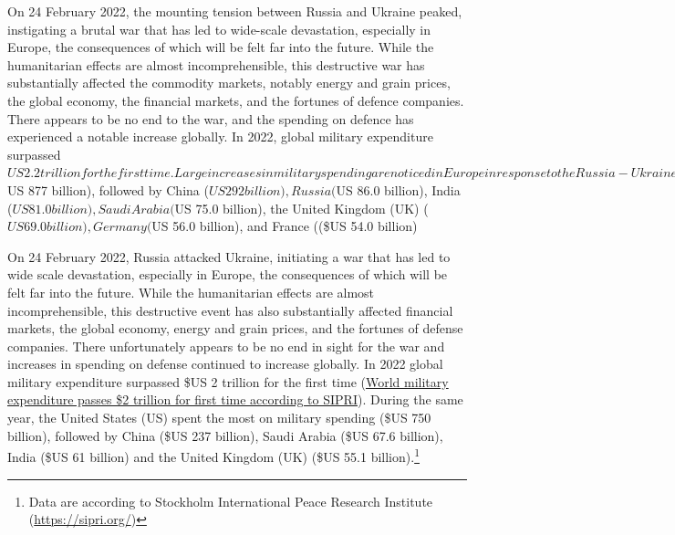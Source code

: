 \documentclass[
  letterpaper,
  DIV=11,
  numbers=noendperiod]{scrartcl}
\begin{document}
On 24 February 2022, the mounting tension between Russia and Ukraine
peaked, instigating a brutal war that has led to wide-scale devastation,
especially in Europe, the consequences of which will be felt far into
the future. While the humanitarian effects are almost incomprehensible,
this destructive war has substantially affected the commodity markets,
notably energy and grain prices, the global economy, the financial
markets, and the fortunes of defence companies. There appears to be no
end to the war, and the spending on defence has experienced a notable
increase globally. In 2022, global military expenditure surpassed
\(US 2.2 trillion for the first time. Large increases in military spending are noticed in Europe in response to the Russia-Ukraine war. To top the chart, the United States (US) spent the most on military spending (\)US
877 billion), followed by China (\(US 292 billion), Russia (\)US 86.0
billion), India (\(US 81.0 billion), Saudi Arabia (\)US 75.0 billion),
the United Kingdom (UK) (\(US 69.0 billion), Germany (\)US 56.0
billion), and France ((\$US 54.0 billion)

On 24 February 2022, Russia attacked Ukraine, initiating a war that has
led to wide scale devastation, especially in Europe, the consequences of
which will be felt far into the future. While the humanitarian effects
are almost incomprehensible, this destructive event has also
substantially affected financial markets, the global economy, energy and
grain prices, and the fortunes of defense companies. There unfortunately
appears to be no end in sight for the war and increases in spending on
defense continued to increase globally. In 2022 global military
expenditure surpassed \$US 2 trillion for the first time
(\href{https://www.sipri.org/media/press-release/2022/world-military-expenditure-passes-2-trillion-first-time}{World
military expenditure passes \$2 trillion for first time according to
SIPRI}). During the same year, the United States (US) spent the most on
military spending (\$US 750 billion), followed by China (\$US 237
billion), Saudi Arabia (\$US 67.6 billion), India (\$US 61 billion) and
the United Kingdom (UK) (\$US 55.1 billion).\footnote{Data are according
  to Stockholm International Peace Research Institute
  (\url{https://sipri.org/})}
\end{document}
